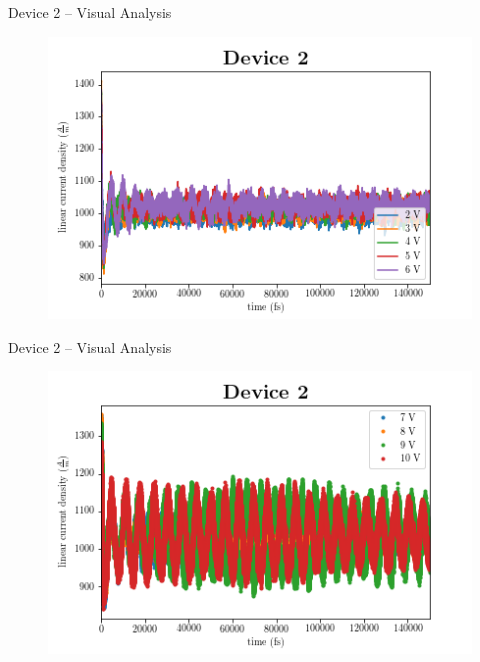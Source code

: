 \documentclass{beamer}
\begin{document}
\begin{frame}{Device 2 -- Visual Analysis}

\begin{figure}
    \centering
    \includegraphics[scale=0.5]{Figures/Device_2/2_to_6V.png}
    \label{fig:dev_2_2}
\end{figure}

\end{frame}

\begin{frame}{Device 2 -- Visual Analysis}
\begin{figure}
    \centering
    \includegraphics[scale=0.5]{Figures/Device_2/7_to_10V.png}
    \label{fig:dev_2_3}
\end{figure}
\end{frame}
\end{document}

